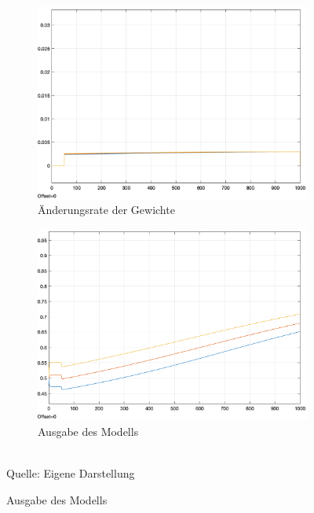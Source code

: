 \begin{figure}[h]
  \caption{Auswirkungen einer nicht-negativen Aktivierungsfunktion auf das \ac{c-ep}}
  \label{fig:C-EP Non-Negative Aktivierungsfunktion}
  \centering
  \begin{subfigure}[b]{0.5\textwidth}
    \includegraphics[width=\textwidth]{abbildungen/c_ep_non_negative_activation_weight_update.png}
    \caption{Änderungsrate der Gewichte}
  \end{subfigure}%
  \hfill
  \begin{subfigure}[b]{0.5\textwidth}
    \includegraphics[width=\textwidth]{abbildungen/c_ep_non_negative_activation_ausgabe.png}
    \caption{Ausgabe des Modells}
  \end{subfigure}
  \\
  Quelle: Eigene Darstellung
\end{figure}

